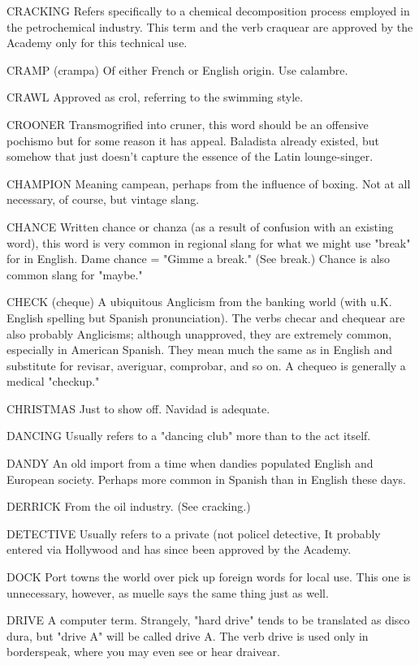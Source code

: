 CRACKING Refers specifically to a chemical decomposition
process employed in the petrochemical industry. This term and the
verb craquear are approved by the Academy only for this technical use.

CRAMP (crampa) Of either French or English origin. Use
calambre.

CRAWL Approved as crol, referring to the swimming style.

CROONER Transmogrified into cruner, this word should be
an offensive pochismo but for some reason it has appeal. Baladista already existed, but somehow that just doesn't capture the essence of the
Latin lounge-singer.

CHAMPION Meaning campean, perhaps from the influence of
boxing. Not at all necessary, of course, but vintage slang.

CHANCE Written chance or chanza (as a result of confusion
with an existing word), this word is very common in regional slang for
what we might use "break" for in English. Dame chance = "Gimme a
break." (See break.) Chance is also common slang for "maybe."

CHECK (cheque) A ubiquitous Anglicism from the banking world (with u.K. English spelling but Spanish pronunciation). The
verbs checar and chequear are also probably Anglicisms; although unapproved, they are extremely common, especially in American Spanish. They mean much the same as in English and substitute for revisar,
averiguar, comprobar, and so on. A chequeo is generally a medical
"checkup."

CHRISTMAS Just to show off. Navidad is adequate.

DANCING Usually refers to a "dancing club" more than to
the act itself.

DANDY An old import from a time when dandies populated
English and European society. Perhaps more common in Spanish than
in English these days.

DERRICK From the oil industry. (See cracking.)

DETECTIVE Usually refers to a private (not policel detective,
It probably entered via Hollywood and has since been approved by the
Academy.

DOCK Port towns the world over pick up foreign words for local use. This one is unnecessary, however, as muelle says the same
thing just as well.

DRIVE A computer term. Strangely, "hard drive" tends to be
translated as disco dura, but "drive A" will be called drive A. The
verb drive is used only in borderspeak, where you may even see or hear
draivear.

